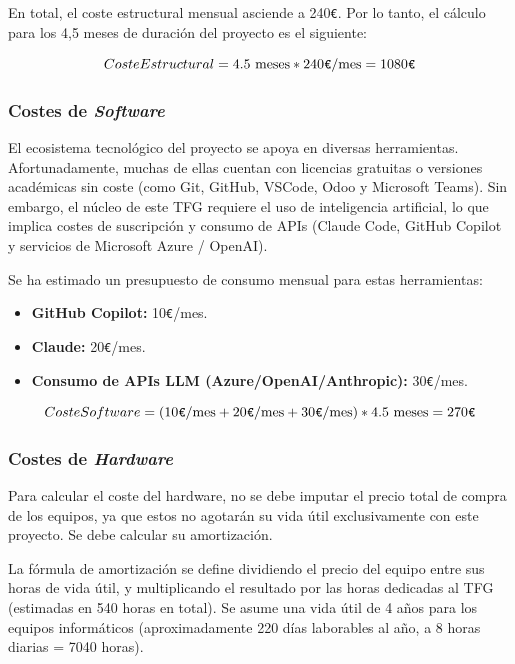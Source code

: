 \documentclass[11pt, letterpaper]{article}
\begin{document}
En total, el coste estructural mensual asciende a 240\verb|€|. Por lo tanto, el cálculo para los 4,5 meses de duración del proyecto es el siguiente:

\begin{equation}
    Coste Estructural = 4{.}5 \text{ meses} * 240\verb|€|/\text{mes} = 1080\verb|€|
\end{equation}

\subsubsection{Costes de \textit{Software}}
El ecosistema tecnológico del proyecto se apoya en diversas herramientas. Afortunadamente, muchas de ellas cuentan con licencias gratuitas o versiones académicas sin coste (como Git, GitHub, VSCode, Odoo y Microsoft Teams). Sin embargo, el núcleo de este TFG requiere el uso de inteligencia artificial, lo que implica costes de suscripción y consumo de APIs (Claude Code, GitHub Copilot y servicios de Microsoft Azure / OpenAI).

Se ha estimado un presupuesto de consumo mensual para estas herramientas:
\begin{itemize}
    \item \textbf{GitHub Copilot:} 10\verb|€|/mes. \cite{github_pricing}
    \item \textbf{Claude:} 20\verb|€|/mes. \cite{claude_plans}
    \item \textbf{Consumo de APIs LLM (Azure/OpenAI/Anthropic):} 30\verb|€|/mes.
\end{itemize}
\begin{equation}
    Coste Software = (10\verb|€|/\text{mes}+ 20\verb|€|/\text{mes} + 30\verb|€|/\text{mes}) * 4{.}5 \text{ meses} = 270\verb|€|
\end{equation}

\subsubsection{Costes de \textit{Hardware}}
Para calcular el coste del hardware, no se debe imputar el precio total de compra de los equipos, ya que estos no agotarán su vida útil exclusivamente con este proyecto. Se debe calcular su amortización. 

La fórmula de amortización se define dividiendo el precio del equipo entre sus horas de vida útil, y multiplicando el resultado por las horas dedicadas al TFG (estimadas en 540 horas en total). Se asume una vida útil de 4 años para los equipos informáticos (aproximadamente 220 días laborables al año, a 8 horas diarias = 7040 horas).
\end{document}
